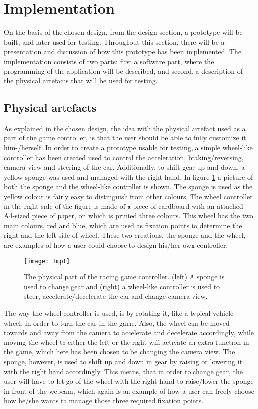 \section{Implementation}
On the basis of the chosen design, from the design section, a prototype will be built, and later used for testing.
Throughout this section, there will be a presentation and discussion of how this prototype has been implemented. 
The implementation consists of two parts: first a software part, where the programming of the application will be described, and second, a description of the physical artefacts that will be used for testing.

\subsection{Physical artefacts}
As explained in the chosen design, the idea with the physical artefact used as a part of the game controller, is that the user should be able to fully customize it him-/herself. 
In order to create a prototype usable for testing, a simple wheel-like controller has been created used to control the acceleration, braking/reversing, camera view and steering of the car. 
Additionally, to shift gear up and down, a yellow sponge was used and managed with the right hand. 
In figure \ref{fig:imp1} a picture of both the sponge and the wheel-like controller is shown. 
The sponge is used as the yellow colour is fairly easy to distinguish from other colours. 
The wheel controller in the right side of the figure is made of a piece of cardboard with an attached A4-sized piece of paper, on which is printed three colours. 
This wheel has the two main colours, red and blue, which are used as fixation points to determine the right and the left side of wheel. 
These two creations, the sponge and the wheel, are examples of how a user could choose to design his/her own controller.
\bigskip

\begin{figure}[!htbp]
\centering
\texttt{[image: Imp1]}
\caption{The physical part of the racing game controller. (left) A sponge is used to change gear and (right) a wheel-like controller is used to steer, accelerate/decelerate the car and change camera view.} 
\label{fig:imp1}
\end{figure}

The way the wheel controller is used, is by rotating it, like a typical vehicle wheel, in order to turn the car in the game. 
Also, the wheel can be moved towards and away from the camera to accelerate and decelerate accordingly, while moving the wheel to either the left or the right will activate an extra function in the game, which here has been chosen to be changing the camera view. 
The sponge, however, is used to shift up and down in gear by raising or lowering it with the right hand accordingly. 
This means, that in order to change gear, the user will have to let go of the wheel with the right hand to raise/lower the sponge in front of the webcam, which again is an example of how a user can freely choose how he/she wants to manage those three required fixation points.

